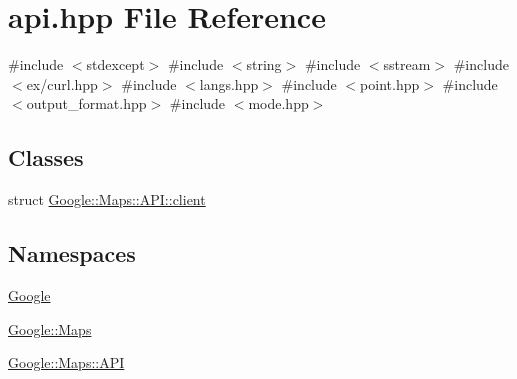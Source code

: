 \hypertarget{a00005}{}\section{api.\+hpp File Reference}
\label{a00005}
{\ttfamily \#include $<$stdexcept$>$}\newline
{\ttfamily \#include $<$string$>$}\newline
{\ttfamily \#include $<$sstream$>$}\newline
{\ttfamily \#include $<$ex/curl.\+hpp$>$}\newline
{\ttfamily \#include $<$langs.\+hpp$>$}\newline
{\ttfamily \#include $<$point.\+hpp$>$}\newline
{\ttfamily \#include $<$output\+\_\+format.\+hpp$>$}\newline
{\ttfamily \#include $<$mode.\+hpp$>$}\newline
\subsection*{Classes}
\begin{DoxyCompactItemize}
\item 
struct \hyperlink{a00040}{Google\+::\+Maps\+::\+A\+P\+I\+::client}
\end{DoxyCompactItemize}
\subsection*{Namespaces}
\begin{DoxyCompactItemize}
\item 
 \hyperlink{a00032}{Google}
\item 
 \hyperlink{a00033}{Google\+::\+Maps}
\item 
 \hyperlink{a00034}{Google\+::\+Maps\+::\+A\+PI}
\end{DoxyCompactItemize}

